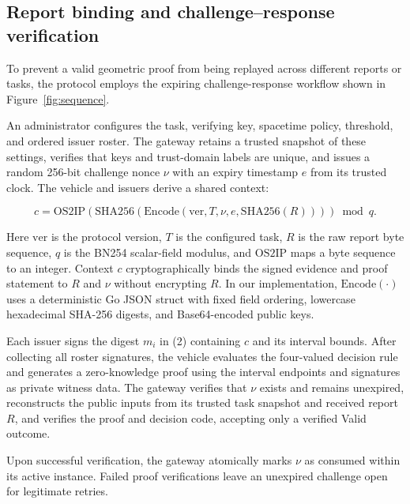 \subsection{Report binding and challenge--response verification}
To prevent a valid geometric proof from being replayed across different reports or tasks, the protocol employs the expiring challenge-response workflow shown in Figure~\ref{fig:sequence}.

An administrator configures the task, verifying key, spacetime policy, threshold, and ordered issuer roster. The gateway retains a trusted snapshot of these settings, verifies that keys and trust-domain labels are unique, and issues a random 256-bit challenge nonce $\nu$ with an expiry timestamp $e$ from its trusted clock. The vehicle and issuers derive a shared context:


\begin{equation}\label{eq:context}
c = \mathrm{OS2IP}(\mathrm{SHA256}(\mathrm{Encode}(\mathrm{ver}, T, \nu, e, \mathrm{SHA256}(R)))) \bmod q.
\end{equation}


Here $\mathrm{ver}$ is the protocol version, $T$ is the configured task, $R$ is the raw report byte sequence, $q$ is the BN254 scalar-field modulus, and $\mathrm{OS2IP}$ maps a byte sequence to an integer. Context $c$ cryptographically binds the signed evidence and proof statement to $R$ and $\nu$ without encrypting $R$. In our implementation, $\mathrm{Encode}(\cdot)$ uses a deterministic Go JSON struct with fixed field ordering, lowercase hexadecimal SHA-256 digests, and Base64-encoded public keys.

Each issuer signs the digest $m_i$ in (2) containing $c$ and its interval bounds. After collecting all roster signatures, the vehicle evaluates the four-valued decision rule and generates a zero-knowledge proof using the interval endpoints and signatures as private witness data. The gateway verifies that $\nu$ exists and remains unexpired, reconstructs the public inputs from its trusted task snapshot and received report $R$, and verifies the proof and decision code, accepting only a verified Valid outcome.

Upon successful verification, the gateway atomically marks $\nu$ as consumed within its active instance. Failed proof verifications leave an unexpired challenge open for legitimate retries.

